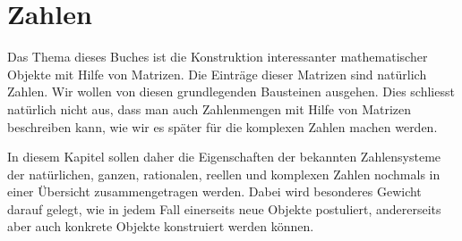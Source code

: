 %
%
%
\chapter{Zahlen
\label{buch:chapter:zahlen}}
\rhead{}

Das Thema dieses Buches ist die Konstruktion interessanter 
mathematischer Objekte mit Hilfe von Matrizen.
Die Einträge dieser Matrizen sind natürlich Zahlen.
Wir wollen von diesen grundlegenden Bausteinen ausgehen.
Dies schliesst natürlich nicht aus, dass man auch Zahlenmengen
mit Hilfe von Matrizen beschreiben kann, wie wir es später für die
komplexen Zahlen machen werden.

In diesem Kapitel sollen daher die Eigenschaften der bekannten
Zahlensysteme der natürlichen, ganzen, rationalen, reellen und
komplexen Zahlen nochmals in einer Übersicht zusammengetragen
werden.
Dabei wird besonderes Gewicht darauf gelegt, wie in jedem Fall
einerseits neue Objekte postuliert, andererseits
aber auch konkrete Objekte konstruiert werden können.








